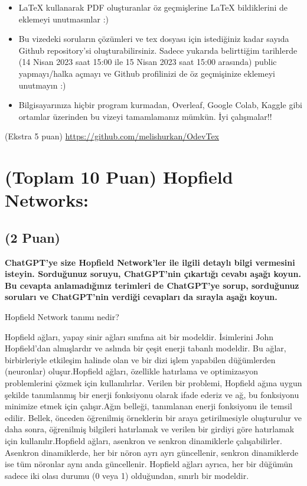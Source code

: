 \documentclass[11pt]{article}
\begin{document}
\begin{itemize}
    \item LaTeX kullanarak PDF oluşturanlar öz geçmişlerine LaTeX bildiklerini de eklemeyi unutmasınlar :)
    \item Bu vizedeki soruların çözümleri ve tex dosyası için istediğiniz kadar sayıda Github repository'si oluşturabilirsiniz. Sadece yukarıda belirttiğim tarihlerde (14 Nisan 2023 saat 15:00 ile 15 Nisan 2023 saat 15:00 arasında) public yapmayı/halka açmayı ve Github profilinizi de öz geçmişinize eklemeyi unutmayın :)
    \item Bilgisayarınıza hiçbir program kurmadan, Overleaf, Google Colab, Kaggle gibi ortamlar üzerinden bu vizeyi tamamlamanız mümkün. İyi çalışmalar!!
\end{itemize}

(Ekstra 5 puan) \url{https://github.com/melishurkan/OdevTex}

\newpage
\section{(Toplam 10 Puan) Hopfield Networks:}

\subsection{(2 Puan)} \textbf{ChatGPT’ye size Hopfield Network’ler ile ilgili detaylı bilgi vermesini isteyin. Sorduğunuz soruyu, ChatGPT'nin çıkartığı cevabı aşağı koyun. Bu cevapta anlamadığınız terimleri de ChatGPT’ye sorup, sorduğunuz soruları ve ChatGPT’nin verdiği cevapları da sırayla aşağı koyun.}

Hopfield Network tanımı nedir?

Hopfield ağları, yapay sinir ağları sınıfına ait bir modeldir. İsimlerini John Hopfield'dan almışlardır ve aslında bir çeşit enerji tabanlı modeldir. Bu ağlar, birbirleriyle etkileşim halinde olan ve bir dizi işlem yapabilen düğümlerden 
(neuronlar) oluşur.Hopfield ağları, özellikle hatırlama ve optimizasyon problemlerini çözmek için kullanılırlar. Verilen bir problemi, Hopfield ağına uygun şekilde tanımlanmış bir enerji fonksiyonu olarak ifade ederiz ve ağ, 
bu fonksiyonu minimize etmek için çalışır.Ağın belleği, tanımlanan enerji fonksiyonu ile temsil edilir. Bellek, önceden öğrenilmiş örneklerin bir araya getirilmesiyle oluşturulur ve daha sonra, öğrenilmiş bilgileri hatırlamak ve verilen bir girdiyi
 göre hatırlamak için kullanılır.Hopfield ağları, asenkron ve senkron dinamiklerle çalışabilirler. Asenkron dinamiklerde, her bir nöron ayrı ayrı güncellenir, senkron dinamiklerde ise tüm nöronlar aynı anda güncellenir. Hopfield ağları ayrıca,
 her bir düğümün sadece iki olası durumu (0 veya 1) olduğundan, sınırlı bir modeldir.
\end{document}
